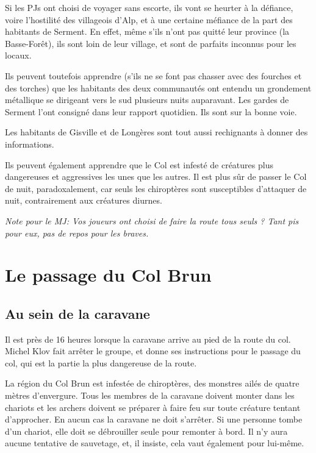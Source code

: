 \documentclass[10pt,twoside,twocolumn,openany,bg=print,justified]{dndbook}
\begin{document}
Si les PJs ont choisi de voyager sans escorte, ils vont se heurter à la défiance, voire l'hostilité des villageois d'Alp, et à une certaine méfiance de la part des habitants de Serment. En effet, même s'ils n'ont pas quitté leur province (la Basse-Forêt), ils sont loin de leur village, et sont de parfaits inconnus pour les locaux.

Ils peuvent toutefois apprendre (s'ils ne se font pas chasser avec des fourches et des torches) que les habitants des deux communautés ont entendu un grondement métallique se dirigeant vers le sud plusieurs nuits auparavant. Les gardes de Serment l'ont consigné dans leur rapport quotidien. Ils sont sur la bonne voie.

Les habitants de Gisville et de Longères sont tout aussi rechignants à donner des informations.

Ils peuvent également apprendre que le Col est infesté de créatures plus dangereuses et aggressives les unes que les autres. Il est plus sûr de passer le Col de nuit, paradoxalement, car seuls les chiroptères sont susceptibles d'attaquer de nuit, contrairement aux créatures diurnes.

\textit{Note pour le MJ: Vos joueurs ont choisi de faire la route tous seuls ? Tant pis pour eux, pas de repos pour les braves.}


\section{Le passage du Col Brun}

\subsection*{Au sein de la caravane}

Il est près de 16 heures lorsque la caravane arrive au pied de la route du col. Michel Klov fait arrêter le groupe, et donne ses instructions pour le passage du col, qui est la partie la plus dangereuse de la route.

La région du Col Brun est infestée de chiroptères, des monstres ailés de quatre mètres d'envergure. Tous les membres de la caravane doivent monter dans les chariots et les archers doivent se préparer à faire feu sur toute créature tentant d'approcher. En aucun cas la caravane ne doit s'arrêter. Si une personne tombe d'un chariot, elle doit se débrouiller seule pour remonter à bord. Il n'y aura aucune tentative de sauvetage, et, il insiste, cela vaut également pour lui-même.
\end{document}
